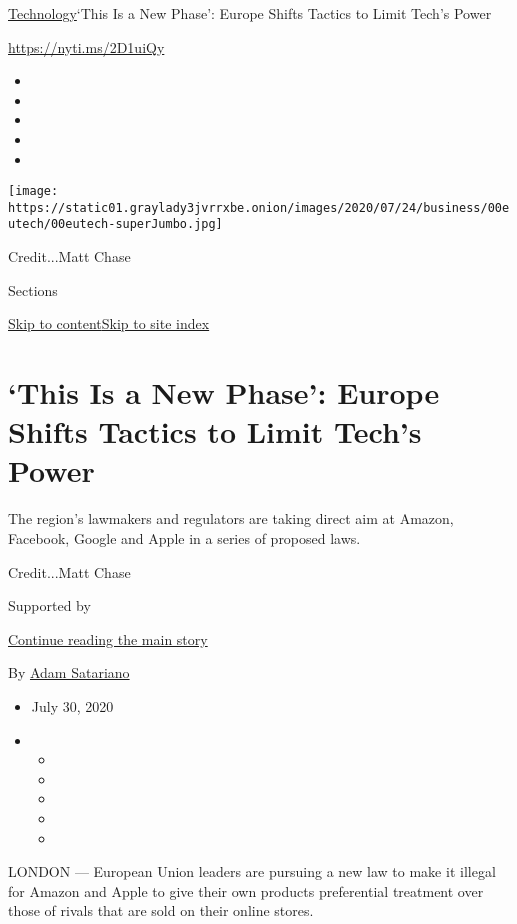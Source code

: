 \href{/section/technology}{Technology}\textbar{}`This Is a New Phase':
Europe Shifts Tactics to Limit Tech's Power

\url{https://nyti.ms/2D1uiQy}

\begin{itemize}
\item
\item
\item
\item
\item
\end{itemize}

\texttt{[image: https://static01.graylady3jvrrxbe.onion/images/2020/07/24/business/00eutech/00eutech-superJumbo.jpg]}

Credit...Matt Chase

Sections

\protect\hyperlink{site-content}{Skip to
content}\protect\hyperlink{site-index}{Skip to site index}

\hypertarget{this-is-a-new-phase-europe-shifts-tactics-to-limit-techs-power}{%
\section{`This Is a New Phase': Europe Shifts Tactics to Limit Tech's
Power}\label{this-is-a-new-phase-europe-shifts-tactics-to-limit-techs-power}}

The region's lawmakers and regulators are taking direct aim at Amazon,
Facebook, Google and Apple in a series of proposed laws.

Credit...Matt Chase

Supported by

\protect\hyperlink{after-sponsor}{Continue reading the main story}

By \href{https://www.nytimes3xbfgragh.onion/by/adam-satariano}{Adam
Satariano}

\begin{itemize}
\item
  July 30, 2020
\item
  \begin{itemize}
  \item
  \item
  \item
  \item
  \item
  \end{itemize}
\end{itemize}

LONDON --- European Union leaders are pursuing a new law to make it
illegal for Amazon and Apple to give their own products preferential
treatment over those of rivals that are sold on their online stores.

